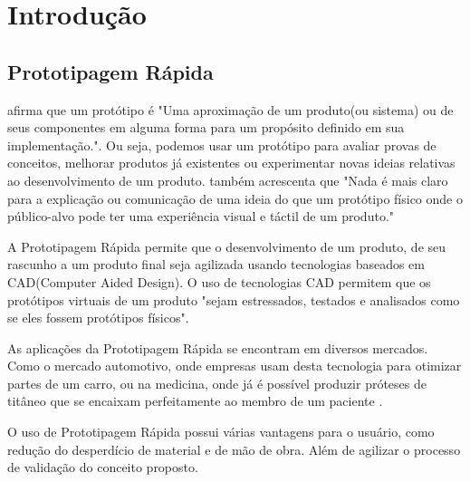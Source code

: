 \section{Introdução}

\newpage

\subsection{Prototipagem Rápida}
\citet{rapidproto2010} afirma que um protótipo é "Uma aproximação de um produto(ou sistema)
ou de seus componentes em alguma forma para um propósito definido em sua implementação.".
Ou seja, podemos usar um protótipo para avaliar provas de conceitos, melhorar produtos
já existentes ou experimentar novas ideias relativas ao desenvolvimento de um produto.
\citet{rapidproto2010} também acrescenta que "Nada é mais claro para a explicação ou comunicação
de uma ideia do que um protótipo físico onde o público-alvo pode ter uma experiência visual
e táctil de um produto."

A Prototipagem Rápida permite que o desenvolvimento de um produto, de seu rascunho
a um produto final seja agilizada usando tecnologias baseados em CAD(Computer Aided Design).
O uso de tecnologias CAD permitem que os protótipos virtuais de um produto
\citet{rapidproto2010} "sejam estressados, testados e analisados como se eles fossem protótipos físicos".

As aplicações da Prototipagem Rápida se encontram em diversos mercados. Como o mercado
automotivo, onde empresas usam desta tecnologia para otimizar partes de um carro\citet{artley2017}, ou na medicina,
onde já é possível produzir próteses de titâneo que se encaixam perfeitamente ao membro de um paciente \citet{nature2017}.

O uso de Prototipagem Rápida possui várias vantagens para o usuário, como redução do desperdício
de material e de mão de obra. Além de agilizar o processo de validação do conceito proposto.\citet{rapidproto2010}

